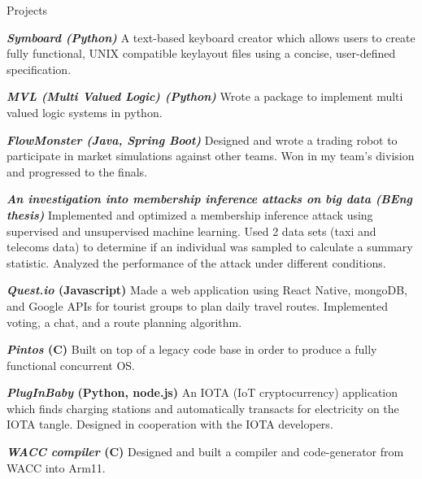 \documentclass[10pt]{resume} %
\begin{document}
\begin{rSection}{Projects}

  \item \textbf{\textit{Symboard (Python)}} A text-based keyboard creator which
    allows users to create fully functional, UNIX compatible keylayout files
    using a concise, user-defined specification.
  \item \textbf{\textit{MVL (Multi Valued Logic) (Python)}} Wrote a package to
    implement multi valued logic systems in python.
  \item \textbf{\textit{FlowMonster (Java, Spring Boot)}} Designed and wrote a
    trading robot to participate in market simulations against other teams. Won
    in my team's division and progressed to the finals.
  \item \textbf{\textit{An investigation into membership inference attacks on
    big data (BEng thesis)}} Implemented and optimized a membership inference
    attack using supervised and unsupervised machine learning. Used 2 data sets
    (taxi and telecoms data) to determine if an individual was sampled to
    calculate a summary statistic. Analyzed the performance of the attack
    under different conditions.
  \item \textbf{\textit{Quest.io} (Javascript)} Made a web application using
    React Native, mongoDB, and Google APIs for tourist groups to plan daily
    travel routes. Implemented voting, a chat, and a route planning algorithm.
  \item \textbf{\textit{Pintos} (C)} Built on top of a legacy code base in
    order to produce a fully functional concurrent OS.
  \item \textbf{\textit{PlugInBaby} (Python, node.js)} An IOTA (IoT
    cryptocurrency) application which finds charging stations and
    automatically transacts for electricity on the IOTA tangle. Designed in
    cooperation with the IOTA developers.
  \item \textbf{\textit{WACC compiler} (C)} Designed and built a compiler and
    code-generator from WACC into Arm11.

\end{rSection}

\end{document}
